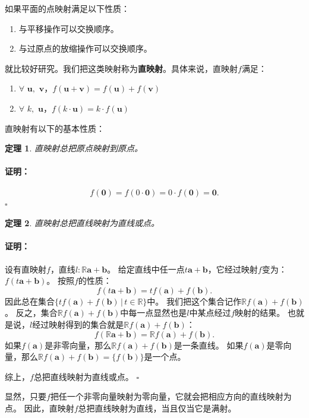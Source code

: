\documentclass[12pt,UTF8]{ctexbook}
\newtheorem{tm}{定理}[section]
\renewenvironment{proof}{\paragraph{\textbf{证明：}}}{\hfill$\square$}
\begin{document}
如果平面的点映射满足以下性质：
\begin{enumerate}
    \item 与平移操作可以交换顺序。
    \item 与过原点的放缩操作可以交换顺序。
\end{enumerate}
就比较好研究。我们把这类映射称为\textbf{直映射}。具体来说，直映射$f$满足：
\begin{enumerate}
    \item $\forall \,\,\mathbf{u}, \,\,\mathbf{v}$，$f(\mathbf{u} + \mathbf{v}) = f(\mathbf{u}) + f(\mathbf{v})$
    \item $\forall \,\,k, \,\, \mathbf{u}$，$f(k\cdot \mathbf{u}) = k \cdot f(\mathbf{u})$
\end{enumerate}
直映射有以下的基本性质：
\begin{tm}
    直映射总把原点映射到原点。
\end{tm}
\begin{proof}
    $$f(\mathbf{0}) = f(0\cdot \mathbf{0}) = 0 \cdot f(\mathbf{0}) = \mathbf{0}.$$
\end{proof}
\begin{tm}
    直映射总把直线映射为直线或点。
\end{tm}
\begin{proof}
    设有直映射$f$，直线$l: \mathbb{R}\mathbf{a} + \mathbf{b}$。
    给定直线中任一点$t\mathbf{a} + \mathbf{b}$，它经过映射$f$变为：$f(t\mathbf{a} + \mathbf{b})$。
    按照$f$的性质：
    $$ f(t\mathbf{a} + \mathbf{b}) = tf(\mathbf{a}) + f(\mathbf{b}).$$
    因此总在集合$\{tf(\mathbf{a}) + f(\mathbf{b})\,|\, t\in\mathbb{R}\}$中。
    我们把这个集合记作$\mathbb{R}f(\mathbf{a}) + f(\mathbf{b})$。
    反之，集合$\mathbb{R}f(\mathbf{a}) + f(\mathbf{b})$中每一点显然也是$l$中某点经过$f$映射的结果。
    也就是说，$l$经过映射得到的集合就是$\mathbb{R}f(\mathbf{a}) + f(\mathbf{b})$：
    $$ f(\mathbb{R}\mathbf{a} + \mathbf{b}) = \mathbb{R}f(\mathbf{a}) + f(\mathbf{b}).$$
    如果$f(\mathbf{a})$是非零向量，那么$\mathbb{R}f(\mathbf{a}) + f(\mathbf{b})$是一条直线。
    如果$f(\mathbf{a})$是零向量，那么$\mathbb{R}f(\mathbf{a}) + f(\mathbf{b}) = \{f(\mathbf{b})\}$是一个点。

    综上，$f$总把直线映射为直线或点。
\end{proof}

显然，只要$f$把任一个非零向量映射为零向量，它就会把相应方向的直线映射为点。
因此，直映射$f$总把直线映射为直线，当且仅当它是满射。
\end{document}

